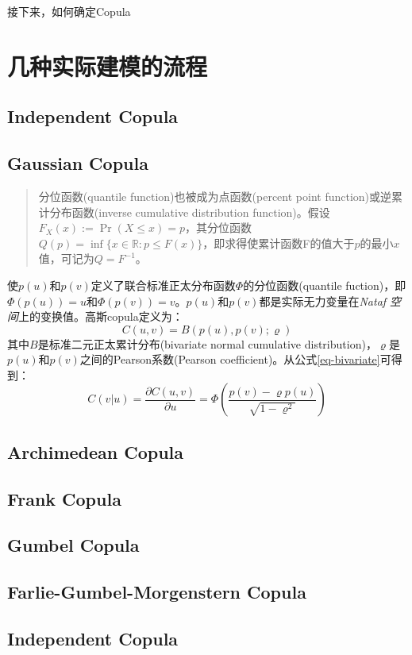 接下来，如何确定Copula


\section{几种实际建模的流程}

\subsection{Independent Copula}
\subsection{Gaussian Copula}
\begin{quotation}
    分位函数(quantile function)也被成为点函数(percent point function)或逆累计分布函数(inverse cumulative distribution function)。假设$F_X(x) := \Pr (X \leq x) = p$，其分位函数$Q(p) = \inf\{x \in \mathbb{R} : p \leq F(x)\}$，即求得使累计函数F的值大于$p$的最小$x$值，可记为$Q = F^{-1}$。
\end{quotation}

使$p(u)$和$p(v)$定义了联合标准正太分布函数$\Phi$的\textcolor[rgb]{1,0,0}{分位函数(quantile fuction)}，即$\Phi(p(u)) = u$和$\Phi(p(v))=v$。$p(u)$和$p(v)$都是实际无力变量在\emph{Nataf 空间}上的变换值。高斯copula定义为：
\begin{equation}
    \label{eq-gaussiancopula}
    C(u,v) = B(p(u),p(v);\varrho)
\end{equation}
其中$B$是标准二元正太累计分布(bivariate normal cumulative distribution)，$\varrho$是$p(u)$和$p(v)$之间的Pearson系数(Pearson coefficient)。从公式\ref{eq-bivariate}可得到：
\begin{equation} 
    \label{eq-copula-bivariate}
    C(v|u) = \dfrac{\partial C(u,v)}{\partial u} = \Phi \left(\dfrac{p(v)-\varrho p(u)}{\sqrt{1-\varrho^{2}}}\right)
\end{equation} 


\subsection{Archimedean Copula}
\subsection{Frank Copula}
\subsection{Gumbel Copula}
\subsection{Farlie-Gumbel-Morgenstern  Copula}
\subsection{Independent Copula}
